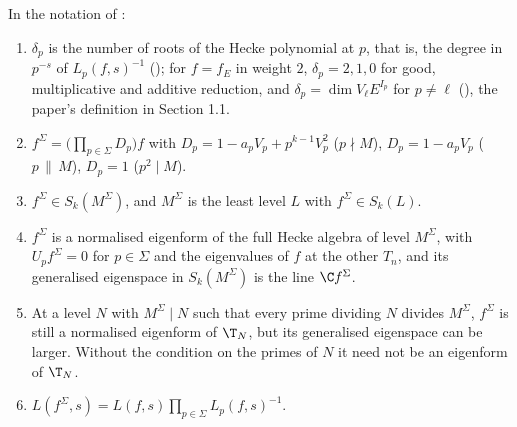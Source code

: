 \begin{proposition}\label{prop:hecke:depletion}
In the notation of :
\begin{enumerate}[label=(\roman*)]
\item $\delta_p$ is the number of roots of the Hecke polynomial at $p$, that is, the degree in $p^{-s}$ of $L_p(f,s)^{-1}$ (); for $f=f_E$ in weight $2$,
$\delta_p=2,1,0$ for good, multiplicative and additive reduction, and $\delta_p=\dim V_\ell E^{I_p}$ for $p\ne\ell$ (), the paper's definition in Section 1.1.
\item $f^\Sigma=\bigl(\prod_{p\in\Sigma}D_p\bigr)f$ with $D_p=1-a_pV_p+p^{k-1}V_p^2$ ($p\nmid M$), $D_p=1-a_pV_p$ ($p\,\|\,M$), $D_p=1$ ($p^2\mid M$).
\item $f^\Sigma\in S_k(M^\Sigma)$, and $M^\Sigma$ is the least level $L$ with $f^\Sigma\in S_k(L)$.
\item $f^\Sigma$ is a normalised eigenform of the full Hecke algebra of level $M^\Sigma$, with $U_pf^\Sigma=0$ for $p\in\Sigma$ and the eigenvalues of $f$ at the other $T_n$, and its generalised
eigenspace in $S_k(M^\Sigma)$ is the line $\C f^\Sigma$.
\item At a level $N$ with $M^\Sigma\mid N$ such that every prime dividing $N$ divides $M^\Sigma$, $f^\Sigma$ is still a normalised eigenform of $\T_N$, but its generalised eigenspace can be larger. Without the condition on the primes of $N$ it need not be an eigenform of $\T_N$.
\item $L(f^\Sigma,s)=L(f,s)\prod_{p\in\Sigma}L_p(f,s)^{-1}$.
\end{enumerate}
\end{proposition}

